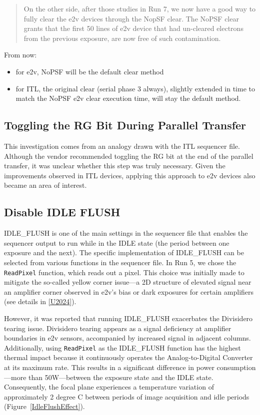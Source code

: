 \begin{quote}
On the other side, after those studies in Run 7, we now have a good way
to fully clear the e2v devices through the NopSF clear. The NoPSF clear
grants that the first 50 lines of e2v device that had un-cleared
electrons from the previous exposure, are now free of such
contamination.
\end{quote}

From now:

\begin{itemize}
\tightlist
\item
  for e2v, NoPSF will be the default clear method
\item
  for ITL, the original clear (serial phase 3 always), slightly extended
  in time to match the NoPSF e2v clear execution time, will stay the
  default method.
\end{itemize}

\subsection{Toggling the RG Bit During Parallel Transfer}\label{noRGe2v}
This investigation comes from an analogy drawn with the ITL sequencer file. Although the vendor recommended toggling the RG bit at the end of the parallel transfer, it was unclear whether this step was truly necessary. Given the improvements observed in ITL devices, applying this approach to e2v devices also became an area of interest.

\subsection{Disable IDLE FLUSH}\label{thermal-optimization}

IDLE\_FLUSH is one of the main settings in the sequencer file that enables the sequencer output to run while in the IDLE state (the period between one exposure and the next). The specific implementation of IDLE\_FLUSH can be selected from various functions in the sequencer file. In Run 5, we chose the \texttt{ReadPixel} function, which reads out a pixel. This choice was initially made to mitigate the so-called yellow corner issue—a 2D structure of elevated signal near an amplifier corner observed in e2v's bias or dark exposures for certain amplifiers (see details in \hyperref[U2024]{{[}U2024{]}}).

However, it was reported that running IDLE\_FLUSH exacerbates the Divisidero tearing issue. Divisidero tearing appears as a signal deficiency at amplifier boundaries in e2v sensors, accompanied by increased signal in adjacent columns. Additionally, using \texttt{ReadPixel} as the IDLE\_FLUSH function has the highest thermal impact because it continuously operates the Analog-to-Digital Converter at its maximum rate. This results in a significant difference in power consumption—more than 50W—between the exposure state and the IDLE state. Consequently, the focal plane experiences a temperature variation of approximately 2 degree C between periods of image acquisition and idle periods (Figure~\ref{IdleFlushEffect}).

